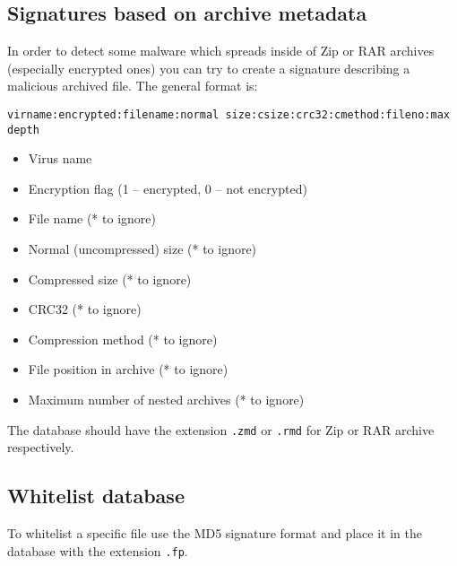 \documentclass[a4paper,titlepage,12pt]{article}
\begin{document}
    \subsection{Signatures based on archive metadata}
    In order to detect some malware which spreads inside of Zip or RAR archives
    (especially encrypted ones) you can try to create a signature describing
    a malicious archived file. The general format is:
\begin{verbatim}
virname:encrypted:filename:normal size:csize:crc32:cmethod:fileno:max depth
\end{verbatim}
    \begin{itemize}
	\item Virus name
	\item Encryption flag (1 -- encrypted, 0 -- not encrypted)
	\item File name (* to ignore)
	\item Normal (uncompressed) size (* to ignore)
	\item Compressed size (* to ignore)
	\item CRC32 (* to ignore)
	\item Compression method (* to ignore)
	\item File position in archive (* to ignore)
	\item Maximum number of nested archives (* to ignore)
    \end{itemize}
    The database should have the extension \verb+.zmd+ or \verb+.rmd+ for
    Zip or RAR archive respectively.

    \subsection{Whitelist database}
    To whitelist a specific file use the MD5 signature format and place
    it in the database with the extension \verb+.fp+.
\end{document}
